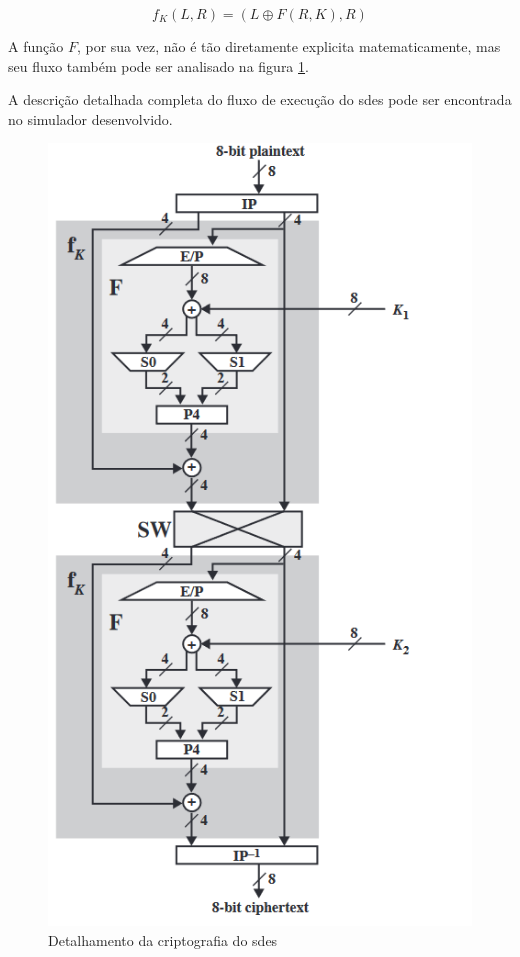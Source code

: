 \[f_K(L, R) = (L \oplus F(R, K), R)\]

A função \(F\), por sua vez, não é tão diretamente explicita matematicamente, mas seu fluxo também pode ser analisado na figura \ref{fig:sdesdetail}. \cite{stallings10}

A descrição detalhada completa do fluxo de execução do \acrshort{sdes} pode ser encontrada no simulador desenvolvido.

\begin{figure}[H]
    \centering
    \caption{Detalhamento da criptografia do \acrshort{sdes}}
    \label{fig:sdesdetail}
    \includegraphics[width=.5\linewidth]{Figuras/SDESEncrypDetail.png}
\end{figure}

